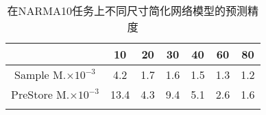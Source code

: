 \begin{center}
\begin{table}
	\caption{在NARMA10任务上不同尺寸简化网络模型的预测精度}
	\renewcommand\arraystretch{1.2}
	\setlength{\tabcolsep}{12pt}
	\begin{tabular}{ccccccc}
	\toprule
		 							&	10		&	20		&	30		&	40		&	60		&	80		\\	\midrule
	Sample M.\(\times 10^{-3}\)		&	4.2		&	1.7		&	1.6		&	1.5		&	1.3		&	1.2	 \\	\hline
	PreStore M.\(\times 10^{-3}\)	&	13.4	&	4.3		&	9.4		&	5.1		&	2.6		&	1.6	\\	
	\bottomrule
	\label{tab:narma10}
	\end{tabular}
\end{table}
\vspace{-3em}
\end{center}
